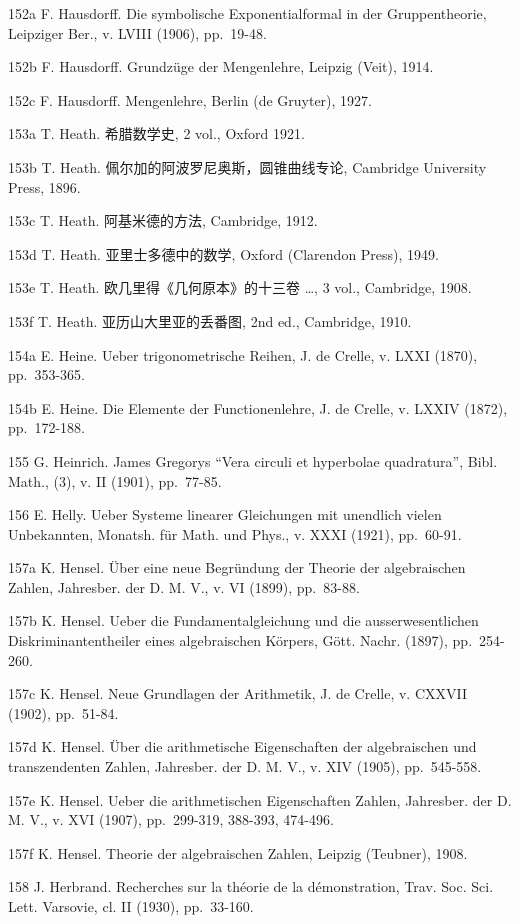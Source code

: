 152a F. Hausdorff. Die symbolische Exponentialformal in der Gruppentheorie, Leipziger Ber., v. LVIII (1906), pp.~19-48.

152b F. Hausdorff. Grundzüge der Mengenlehre, Leipzig (Veit), 1914.

152c F. Hausdorff. Mengenlehre, Berlin (de Gruyter), 1927.

153a T. Heath. 希腊数学史, 2 vol., Oxford 1921.

153b T. Heath. 佩尔加的阿波罗尼奥斯，圆锥曲线专论, Cambridge University Press, 1896.

153c T. Heath. 阿基米德的方法, Cambridge, 1912.

153d T. Heath. 亚里士多德中的数学, Oxford (Clarendon Press), 1949.

153e T. Heath. 欧几里得《几何原本》的十三卷 \ldots, 3 vol., Cambridge, 1908.

153f T. Heath. 亚历山大里亚的丢番图, 2nd ed., Cambridge, 1910.

154a E. Heine. Ueber trigonometrische Reihen, J. de Crelle, v. LXXI (1870), pp.~353-365.

154b E. Heine. Die Elemente der Functionenlehre, J. de Crelle, v. LXXIV (1872), pp.~172-188.

155 G. Heinrich. James Gregorys ``Vera circuli et hyperbolae quadratura'', Bibl. Math., (3), v. II (1901), pp.~77-85.

156 E. Helly. Ueber Systeme linearer Gleichungen mit unendlich vielen Unbekannten, Monatsh. für Math. und Phys., v. XXXI (1921), pp.~60-91.

157a K. Hensel. Über eine neue Begründung der Theorie der algebraischen Zahlen, Jahresber. der D. M. V., v. VI (1899), pp.~83-88.

157b K. Hensel. Ueber die Fundamentalgleichung und die ausserwesentlichen Diskriminantentheiler eines algebraischen Körpers, Gött. Nachr. (1897), pp.~254-260.

157c K. Hensel. Neue Grundlagen der Arithmetik, J. de Crelle, v. CXXVII (1902), pp.~51-84.

157d K. Hensel. Über die arithmetische Eigenschaften der algebraischen und transzendenten Zahlen, Jahresber. der D. M. V., v. XIV (1905), pp.~545-558.

157e K. Hensel. Ueber die arithmetischen Eigenschaften Zahlen, Jahresber. der D. M. V., v. XVI (1907), pp.~299-319, 388-393, 474-496.

157f K. Hensel. Theorie der algebraischen Zahlen, Leipzig (Teubner), 1908.

158 J. Herbrand. Recherches sur la théorie de la démonstration, Trav. Soc. Sci. Lett. Varsovie, cl. II (1930), pp.~33-160.

